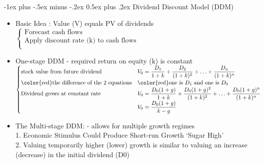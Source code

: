\documentclass[10pt,landscape]{article}
\makeatletter
\renewcommand{\section}{\@startsection{section}{1}{0mm}%
                                {-1ex plus -.5ex minus -.2ex}%
                                {0.5ex plus .2ex}%
                                {\normalfont\large\bfseries}}
\makeatother
\begin{document}
\begin{multicols}{2}
    \section{Dividend Discount Model (DDM)}
    \begin{itemize}
        \item Basic Idea : Value (V) equals PV of dividends\\
        	$
            \begin{cases}
                \text{Forecast cash flows}\\
                \text{Apply discount rate (k) to cash flows}\\
            \end{cases}
            $
        \item One-stage DDM - required return on equity (k) is constant\\
        	$
            \begin{cases}
                \text{stock value from future dividend}& \displaystyle V_0=\frac{D_1}{1+k}+\frac{D_2}{(1+k)^2}+\ldots+\frac{D_n}{(1+k)^n}\\
                \text{\color{red}the difference of the 2 equations}& \text{\color{red}one is $D_1$ and one is $D_0$}\\
                \text{Dividend grows at constant rate}& \displaystyle V_0=\frac{D_0(1+g)}{1+k}+\frac{D_0(1+g)^2}{(1+k)^2}+\ldots+\frac{D_0(1+g)^n}{(1+k)^n}\\
                \text{} & \displaystyle V_0=\frac{D_0(1+g)}{k-g}\\
            \end{cases}
            $
        \item The Multi-stage DDM: - allows for multiple growth regimes\\
        	1. Economic Stimulus Could Produce Short-run Growth ‘Sugar High’\\
        	2. Valuing temporarily higher (lower) growth is similar to valuing an increase (decrease) in the initial dividend (D0)    
    \end{itemize}



\end{multicols}
\end{document}
